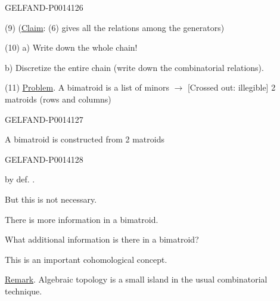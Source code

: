 \begin{GelfandAdjacentEvidence}{GELFAND-P001412}{6}


(9) (\uline{Claim}: (6) gives all the relations among the generators)

(10) a) Write down the whole chain!

b) Discretize the entire chain (write down the combinatorial relations).

(11) \uline{Problem}. A bimatroid is a list of minors \(\longrightarrow\)
[Crossed out: illegible] 2 matroids (rows and columns)
\end{GelfandAdjacentEvidence}
\begin{GelfandAdjacentEvidence}{GELFAND-P001412}{7}


A bimatroid is constructed from 2 matroids

\end{GelfandAdjacentEvidence}
\begin{GelfandAdjacentEvidence}{GELFAND-P001412}{8}


by def. .
\end{GelfandAdjacentEvidence}


But this is not necessary.

There is more information in a bimatroid.

What additional information is there in a bimatroid?

This is an important cohomological concept.

\uline{Remark}. Algebraic topology is a small island in the usual combinatorial technique.


